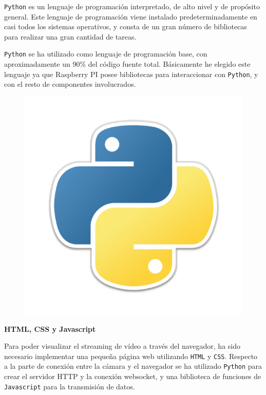 \texttt{Python} es un lenguaje de programación interpretado, de alto nivel y de propósito general. Este lenguaje de programación viene instalado predeterminadamente en casi todos los sistemas operativos, y consta de un gran número de bibliotecas para realizar una gran cantidad de tareas.

\texttt{Python} se ha utilizado como lenguaje de programación base, con aproximadamente un 90\% del código fuente total. Básicamente he elegido este lenguaje ya que Raspberry PI posee bibliotecas para interaccionar con \texttt{Python}, y con el resto de componentes involucrados.

\begin{figure}[h]
	\centering
	\includegraphics[scale=0.13]{images/8}
\end{figure}

\textbf{HTML, CSS y Javascript}

Para poder visualizar el streaming de vídeo a través del navegador, ha sido necesario implementar una pequeña página web utilizando \texttt{HTML} y \texttt{CSS}. Respecto a la parte de conexión entre la cámara y el navegador se ha utilizado \texttt{Python} para crear el servidor HTTP y la conexión websocket, y una biblioteca de funciones de \texttt{Javascript} para la transmisión de datos.

\vspace{-0.5cm}

